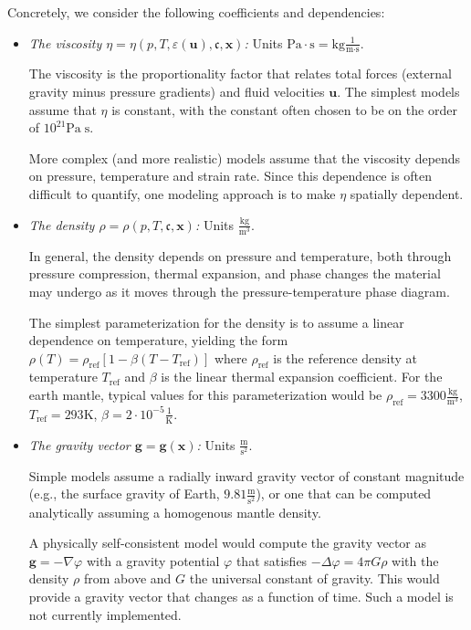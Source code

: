 \documentclass{article}
\begin{document}
Concretely, we consider the following coefficients and dependencies:
\begin{itemize}
\item \textit{The viscosity $\eta=\eta(p,T,\varepsilon(\mathbf u),\mathfrak
c,\mathbf x)$:} Units $\textrm{Pa}\cdot \textrm{s} =
  \textrm{kg}\frac{1}{\textrm{m}\cdot\textrm{s}}$.

  The viscosity is the proportionality factor that relates total forces
  (external gravity minus pressure gradients) and fluid velocities $\mathbf
  u$. The simplest models assume that $\eta$ is constant, with the constant
  often chosen to be on the order of $10^{21} \textrm{Pa}\;\textrm{s}$.

  More complex (and more realistic) models assume that the viscosity depends
  on pressure, temperature and strain rate. Since this dependence is often
  difficult to quantify, one modeling approach is to make $\eta$ spatially
  dependent.

\item \textit{The density $\rho=\rho(p,T,\mathfrak c,\mathbf x)$:} Units
  $\frac{\textrm{kg}}{\textrm{m}^3}$.

  In general, the density depends on pressure and temperature, both through
  pressure compression, thermal expansion, and phase changes the material may
  undergo as it moves through the pressure-temperature phase diagram.

  The simplest parameterization for the density is to assume a linear
  dependence on temperature, yielding the form
  $\rho(T)=\rho_{\text{ref}}[1-\beta (T-T_{\text{ref}})]$ where
  $\rho_{\text{ref}}$ is the reference density at temperature $T_{\text{ref}}$
  and $\beta$ is the linear thermal expansion coefficient. For the earth
  mantle, typical values for this parameterization would be
  $\rho_{\text{ref}}=3300\frac{\textrm{kg}}{\textrm{m}^3}$,
  $T_{\text{ref}}=293 \textrm{K}$, $\beta=2\cdot 10^{-5}
  \frac{1}{\mathrm{K}}$.

\item \textit{The gravity vector $\mathbf g=\mathbf g(\mathbf x)$:} Units
  $\frac{\textrm{m}}{\textrm{s}^2}$.

  Simple models assume a radially inward gravity vector of constant magnitude
  (e.g., the surface gravity of Earth, $9.81 \frac{\textrm{m}}{\textrm{s}^2}$),
  or one that can be computed analytically assuming a homogenous mantle
  density.

  A physically self-consistent model would compute the gravity vector as
  $\mathbf g = -\nabla \varphi$ with a gravity potential $\varphi$ that
  satisfies $-\Delta\varphi=4\pi G\rho$ with the density $\rho$ from above and
  $G$ the universal constant of gravity. This would provide a gravity vector
  that changes as a function of time. Such a model is not currently
  implemented.


\end{itemize}
\end{document}

